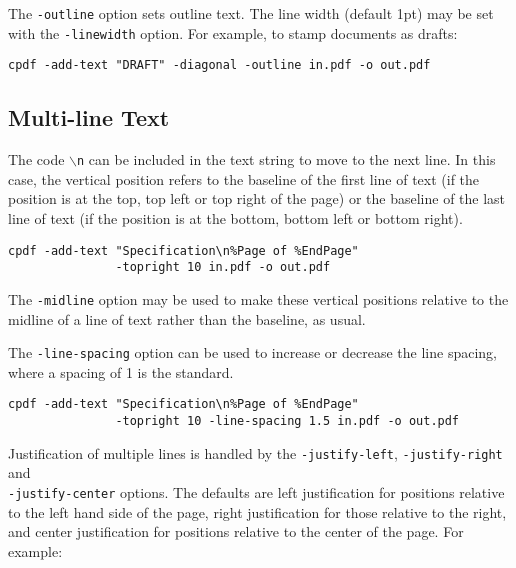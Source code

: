 \documentclass{book}
\begin{document}
  The \texttt{-outline} option sets outline text. The line width (default 1pt)
  may be set with the \texttt{-linewidth} option. For example, to stamp
  documents as drafts:

  \begin{framed}
    \small\verb!cpdf -add-text "DRAFT" -diagonal -outline in.pdf -o out.pdf!
    
  \end{framed}

\subsection{Multi-line Text}

The code \texttt{$\backslash$n} can be included in the text string to move to
the next line. In this case, the vertical position refers to the baseline of
the first line of text (if the position is at the top, top left or top right of
the page) or the baseline of the last line of text (if the position is at the
bottom, bottom left or bottom right).

  \begin{framed}
    \small\begin{verbatim}cpdf -add-text "Specification\n%Page of %EndPage"
               -topright 10 in.pdf -o out.pdf\end{verbatim}
  \end{framed}

\noindent The \texttt{-midline} option may be used to make these vertical positions
relative to the midline of a line of text rather than the baseline, as usual.

The \texttt{-line-spacing} option can be used to increase or decrease the line
spacing, where a spacing of 1 is the standard.

  \begin{framed}
    \small\begin{verbatim}cpdf -add-text "Specification\n%Page of %EndPage"
               -topright 10 -line-spacing 1.5 in.pdf -o out.pdf\end{verbatim}
  \end{framed}

\noindent Justification of multiple lines is handled by the \texttt{-justify-left}, 
\texttt{-justify-right} and\\ \texttt{-justify-center} options. The defaults are
left justification for positions relative to the left hand side of the page,
right justification for those relative to the right, and center justification
for positions relative to the center of the page. For example:
\end{document}
